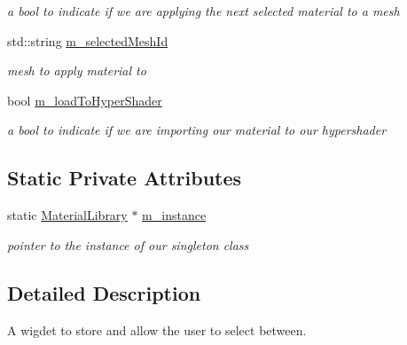 \begin{DoxyCompactItemize}
\begin{DoxyCompactList}\small\item\em a bool to indicate if we are applying the next selected material to a mesh \end{DoxyCompactList}\item 
\hypertarget{class_material_library_a6ee155650b6bbf4b3b959fa2b931ad7d}{std\-::string \hyperlink{class_material_library_a6ee155650b6bbf4b3b959fa2b931ad7d}{m\-\_\-selected\-Mesh\-Id}}\label{class_material_library_a6ee155650b6bbf4b3b959fa2b931ad7d}

\begin{DoxyCompactList}\small\item\em mesh to apply material to \end{DoxyCompactList}\item 
\hypertarget{class_material_library_aa095023b0334021154906729f0cba732}{bool \hyperlink{class_material_library_aa095023b0334021154906729f0cba732}{m\-\_\-load\-To\-Hyper\-Shader}}\label{class_material_library_aa095023b0334021154906729f0cba732}

\begin{DoxyCompactList}\small\item\em a bool to indicate if we are importing our material to our hypershader \end{DoxyCompactList}\end{DoxyCompactItemize}
\subsection*{Static Private Attributes}
\begin{DoxyCompactItemize}
\item 
\hypertarget{class_material_library_aef4ba3f093412e83f5da295865f8b508}{static \hyperlink{class_material_library}{Material\-Library} $\ast$ \hyperlink{class_material_library_aef4ba3f093412e83f5da295865f8b508}{m\-\_\-instance}}\label{class_material_library_aef4ba3f093412e83f5da295865f8b508}

\begin{DoxyCompactList}\small\item\em pointer to the instance of our singleton class \end{DoxyCompactList}\end{DoxyCompactItemize}


\subsection{Detailed Description}
A wigdet to store and allow the user to select between. 


